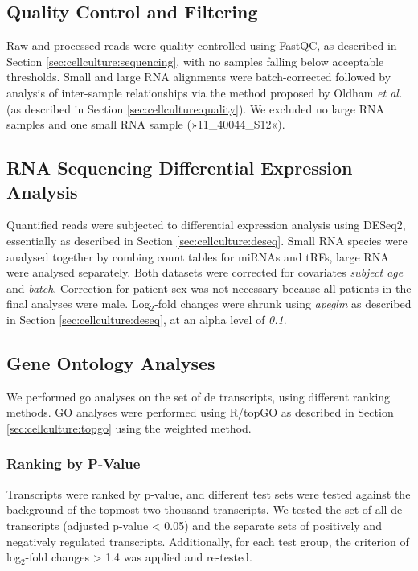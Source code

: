 \begin{method}
\subsection{Quality Control and Filtering}
Raw and processed reads were quality-controlled using FastQC, as described in Section \ref{sec:cellculture:sequencing}, with no samples falling below acceptable thresholds. Small and large RNA alignments were batch-corrected followed by analysis of inter-sample relationships via the method proposed by Oldham \emph{et al.} (as described in Section \ref{sec:cellculture:quality}). We excluded no large RNA samples and one small RNA sample (»11\_40044\_S12«).

\subsection{RNA Sequencing Differential Expression Analysis}
Quantified reads were subjected to differential expression analysis using DESeq2, essentially as described in Section \ref{sec:cellculture:deseq}. Small RNA species were analysed together by combing count tables for miRNAs and tRFs, large RNA were analysed separately. Both datasets were corrected for covariates \emph{subject age} and \emph{batch}. Correction for patient sex was not necessary because all patients in the final analyses were male. Log$_2$-fold changes were shrunk using \emph{apeglm} as described in Section \ref{sec:cellculture:deseq}, at an alpha level of \emph{0.1}.

\subsection{Gene Ontology Analyses}
We performed \ac{go} analyses on the set of \ac{de} transcripts, using different ranking methods. GO analyses were performed using R/topGO as described in Section \ref{sec:cellculture:topgo} using the weighted method.

\subsubsection{Ranking by P-Value}
Transcripts were ranked by p-value, and different test sets were tested against the background of the topmost two thousand transcripts. We tested the set of all \ac{de} transcripts (adjusted p-value < 0.05) and the separate sets of positively and negatively regulated transcripts. Additionally, for each test group, the criterion of log$_2$-fold changes > 1.4 was applied and re-tested.


\end{method}
